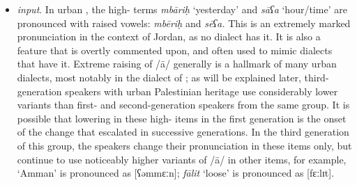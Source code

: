 \documentclass[output=paper]{langsci/langscibook}
\begin{document}
\begin{itemize}
\item[] \textit{ input}. In urban , the high- terms \textit{mbāriḥ} `yesterday’ and \textit{sāʕa} ‘hour/time’ are pronounced with raised vowels: \textit{mbēriḥ} and \textit{sēʕa.} This is an extremely marked pronunciation in the context of Jordan, as no  dialect has it. It is also a feature that is overtly commented upon, and often used to mimic dialects that have it. Extreme raising of /ā/ generally is a hallmark of many urban  dialects, most notably in the dialect of ; as will be explained later, third-generation speakers with urban Palestinian heritage use considerably lower variants than first- and second-generation speakers from the same group. It is possible that lowering in these high- items in the first generation is the onset of the change that escalated in successive generations. In the third generation of this group, the speakers change their pronunciation in these items only, but continue to use noticeably higher variants of /ā/ in other items, for example, ‘Amman’ is pronounced as [ʕəmmɛːn]; \textit{fālit} ‘loose’ is pronounced as [fɛːlɪt].
\end{itemize}
\end{document}
